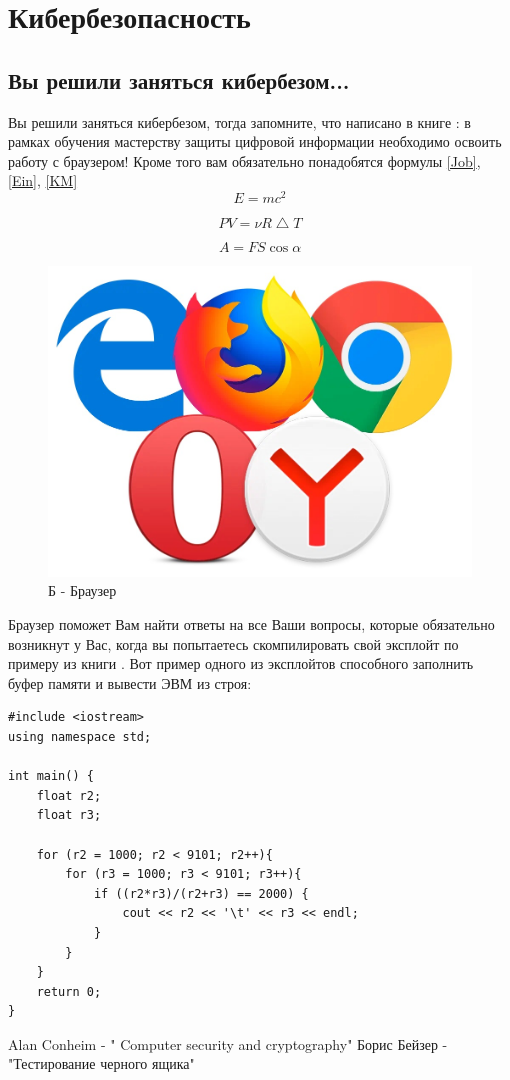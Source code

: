 \documentclass[a4paper, 12pt]{report}
\begin{document}
	\chapter{Кибербезопасность}
	\section{Вы решили заняться кибербезом...}
	
	Вы решили заняться кибербезом, тогда запомните, что написано в книге \cite{1}: в рамках обучения мастерству защиты цифровой информации необходимо освоить работу с браузером! 
	Кроме того вам обязательно понадобятся формулы \ref{Job}, \ref{Ein}, \ref{KM}
	\begin{equation}
		E = {m c^2}
		\label{Ein}
	\end{equation}
	
	\begin{equation}
		PV = {\nu R \bigtriangleup T}
		\label{KM}
	\end{equation}
	
	\begin{equation}
		A = {F S \cos\alpha}
		\label{Job}
	\end{equation}
		
	\begin{figure}[h!]	
		\centering
		\includegraphics[scale=0.2]{scale_1200.jpg}
		\caption{Б - Браузер}
		\label{chargets1}
	\end{figure}
	
	Браузер поможет Вам найти ответы на все Ваши вопросы, которые обязательно возникнут у Вас, когда вы попытаетесь скомпилировать свой эксплойт по примеру из книги \cite{1}.
	\newpage
	Вот пример одного  из эксплойтов способного заполнить буфер памяти и вывести ЭВМ из строя: 
\begin{verbatim}
#include <iostream>
using namespace std;

int main() {
	float r2;
	float r3;
	
	for (r2 = 1000; r2 < 9101; r2++){
		for (r3 = 1000; r3 < 9101; r3++){
			if ((r2*r3)/(r2+r3) == 2000) {
				cout << r2 << '\t' << r3 << endl;
			}
		}
	}
	return 0;
}
\end{verbatim}
	
	
		\begin{thebibliography}{}
		  Alan Conheim   -  " Computer security and cryptography"
		 Борис Бейзер  -  "Тестирование черного ящика"
		\end{thebibliography}
\end{document}
